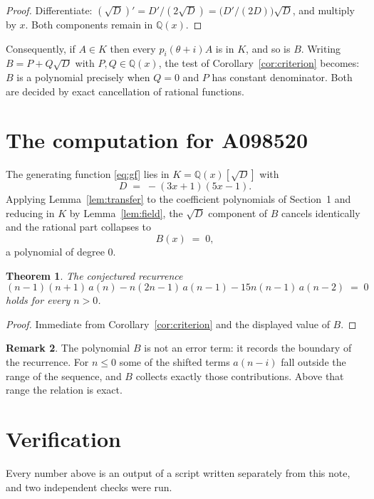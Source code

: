 \documentclass[11pt,a4paper]{article}
\theoremstyle{plain}
\newtheorem{theorem}{Theorem}
\theoremstyle{definition}
\newtheorem{remark}[theorem]{Remark}
\begin{document}
\begin{proof}
Differentiate: $(\sqrt{D})'=D'/(2\sqrt{D})=\bigl(D'/(2D)\bigr)\sqrt{D}$, and multiply by
$x$. Both components remain in $\mathbb{Q}(x)$.
\end{proof}

Consequently, if $A\in K$ then every $p_{i}(\theta+i)A$ is in $K$, and so is $B$. Writing
$B=P+Q\sqrt{D}$ with $P,Q\in\mathbb{Q}(x)$, the test of Corollary~\ref{cor:criterion}
becomes: $B$ is a polynomial precisely when $Q=0$ and $P$ has constant denominator. Both
are decided by exact cancellation of rational functions.

\section{The computation for A098520}

The generating function \eqref{eq:gf} lies in $K=\mathbb{Q}(x)[\sqrt{D}]$ with
\[
D \;=\; - \left(3 x + 1\right) \left(5 x - 1\right) .
\]
Applying Lemma~\ref{lem:transfer} to the coefficient polynomials of Section~1 and reducing
in $K$ by Lemma~\ref{lem:field}, the $\sqrt{D}$ component of $B$ cancels identically and
the rational part collapses to
\[
B(x)\;=\;0 ,
\]
a polynomial of degree $0$.

\begin{theorem}
The conjectured recurrence
\[
\left(n - 1\right) \left(n + 1\right)\,a(n) -  n \left(2 n - 1\right)\,a(n-1) -  15 n \left(n - 1\right)\,a(n-2) \;=\;0
\]
holds for every $n>0$.
\end{theorem}

\begin{proof}
Immediate from Corollary~\ref{cor:criterion} and the displayed value of $B$.
\end{proof}

\begin{remark}
The polynomial $B$ is not an error term: it records the boundary of the recurrence. For
$n\le0$ some of the shifted terms $a(n-i)$ fall outside the range of the sequence,
and $B$ collects exactly those contributions. Above that range the relation is exact.
\end{remark}

\section{Verification}

Every number above is an output of a script written separately from this note, and two
independent checks were run.
\end{document}
